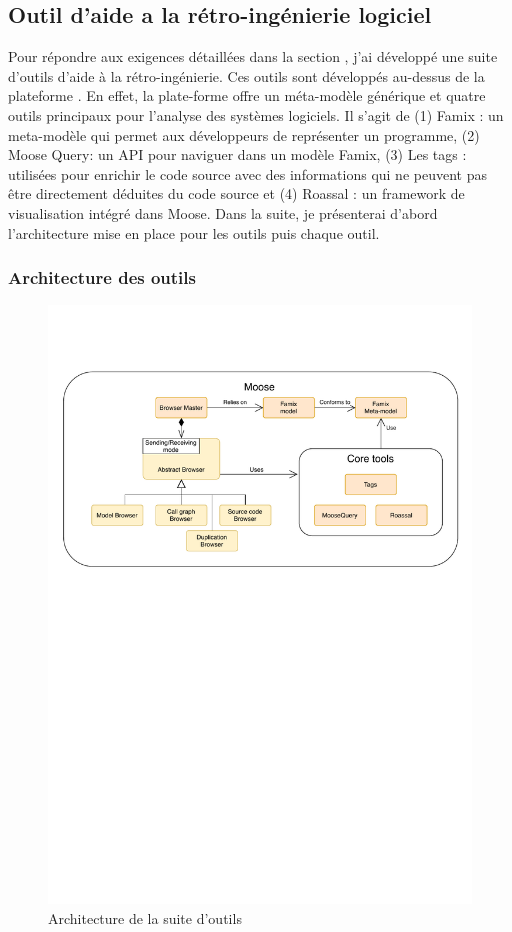 \documentclass[a4paper]{article}
\begin{document}
\subsection{Outil d'aide a la rétro-ingénierie logiciel}
Pour répondre aux exigences détaillées dans la section , j'ai développé une suite d'outils d'aide à la rétro-ingénierie.
Ces outils sont développés au-dessus de la plateforme \cite{Nier05c}.
En effet, la plate-forme offre un méta-modèle générique et quatre outils principaux pour l'analyse des systèmes logiciels.
Il s'agit de (1) Famix : un meta-modèle qui permet aux développeurs de représenter un programme, (2) Moose Query: un API pour naviguer dans un modèle Famix,
(3) Les tags : utilisées pour enrichir le code source avec des informations qui ne peuvent pas être directement déduites du code source et 
(4) Roassal : un framework de visualisation intégré dans Moose.
Dans la suite, je présenterai d'abord l'architecture mise en place pour les outils puis chaque outil.

\subsubsection{Architecture des outils }
\begin{figure}[htbp]
  \begin{center}
  \includegraphics[width=0.7\linewidth]{./figures/architecture.pdf}
  \caption{Architecture de la suite d'outils}
  \label{fig:applicationArchitecture}
  \end{center}
  \vspace{-0.3cm}
\end{figure}
\end{document}
